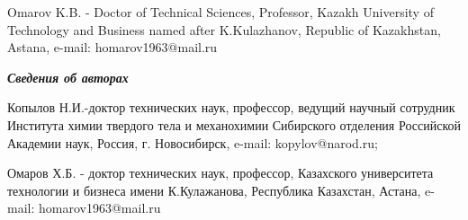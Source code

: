 Omarov K.B. - Doctor of Technical Sciences, Professor, Kazakh University
of Technology and Business named after K.Kulazhanov, Republic of
Kazakhstan, Astana, e-mail: homarov1963@mail.ru

\emph{{\bfseries Сведения об авторах}}

Копылов Н.И.-доктор технических наук, профессор, ведущий научный
сотрудник Института химии твердого тела и механохимии Сибирского
отделения Российской Академии наук, Россия, г. Новосибирск, e-mail:
kopylov@narod.ru;

Омаров Х.Б. - доктор технических наук, профессор, Казахского
университета технологии и бизнеса имени К.Кулажанова, Республика
Казахстан, Астана, e-mail: homarov1963@mail.ru
